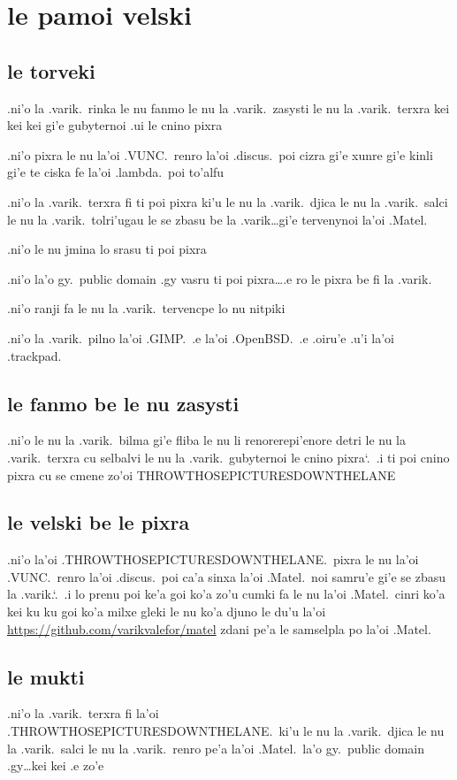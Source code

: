 \documentclass{report}
\newcommand\sds{\spacefactor\sfcode`.\ \space}
\begin{document}
\section{le pamoi velski}
\subsection{le torveki}
.ni'o la .varik.\ rinka le nu fanmo le nu la .varik.\ zasysti le nu la .varik.\ terxra kei kei kei gi'e gubyternoi .ui le cnino pixra

.ni'o pixra le nu la'oi .VUNC.\ renro la'oi .discus.\ poi cizra gi'e xunre gi'e kinli gi'e te ciska fe la'oi .lambda.\ poi to'alfu

.ni'o la .varik.\ terxra fi ti poi pixra ki'u le nu la .varik.\ djica le nu la .varik.\ salci le nu la .varik.\ tolri'ugau le se zbasu be la .varik\ldots gi'e tervenynoi la'oi .Matel.

.ni'o le nu jmina lo srasu ti poi pixra

.ni'o la'o gy.\ public domain .gy vasru ti poi pixra\ldots .e ro le pixra be fi la .varik.

.ni'o ranji fa le nu la .varik.\ tervencpe lo nu nitpiki

.ni'o la .varik.\ pilno la'oi .GIMP.\ .e la'oi .OpenBSD.\ .e .oiru'e .u'i la'oi .trackpad.

\subsection{le fanmo be le nu zasysti}
.ni'o le nu la .varik.\ bilma gi'e fliba le nu li renorerepi'enore detri le nu la .varik.\ terxra cu selbalvi le nu la .varik.\ gubyternoi le cnino pixra\sds  .i ti poi cnino pixra cu se cmene zo'oi THROWTHOSEPICTURESDOWNTHELANE

\subsection{le velski be le pixra}
.ni'o la'oi .THROWTHOSEPICTURESDOWNTHELANE.\ pixra le nu la'oi .VUNC.\ renro la'oi .discus.\ poi ca'a sinxa la'oi .Matel.\ noi samru'e gi'e se zbasu la .varik.\sds  .i lo prenu poi ke'a goi ko'a zo'u cumki fa le nu la'oi .Matel.\ cinri ko'a kei ku ku goi ko'a milxe gleki le nu ko'a djuno le du'u la'oi \url{https://github.com/varikvalefor/matel} zdani pe'a le samselpla po la'oi .Matel.

\subsection{le mukti}
.ni'o la .varik.\ terxra fi la'oi .THROWTHOSEPICTURESDOWNTHELANE.\ ki'u le nu la .varik.\ djica le nu la .varik.\ salci le nu la .varik.\ renro pe'a la'oi .Matel.\ la'o gy.\ public domain .gy\ldots kei kei .e zo'e
\end{document}
